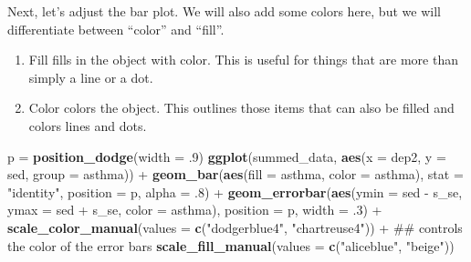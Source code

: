 \documentclass[]{tufte-book}
\newenvironment{Shaded}{}{}
\newcommand{\KeywordTok}[1]{\textcolor[rgb]{0.00,0.44,0.13}{\textbf{#1}}}
\newcommand{\DataTypeTok}[1]{\textcolor[rgb]{0.56,0.13,0.00}{#1}}
\newcommand{\DecValTok}[1]{\textcolor[rgb]{0.25,0.63,0.44}{#1}}
\newcommand{\StringTok}[1]{\textcolor[rgb]{0.25,0.44,0.63}{#1}}
\newcommand{\OperatorTok}[1]{\textcolor[rgb]{0.40,0.40,0.40}{#1}}
\newcommand{\NormalTok}[1]{#1}
\providecommand{\tightlist}{%
  \setlength{\itemsep}{0pt}\setlength{\parskip}{0pt}}
\theoremstyle{definition}
\theoremstyle{definition}
\theoremstyle{remark}
\begin{document}
Next, let's adjust the bar plot. We will also add some colors here, but
we will differentiate between ``color'' and ``fill''.

\begin{enumerate}
\def\labelenumi{\arabic{enumi}.}
\tightlist
\item
  Fill fills in the object with color. This is useful for things that
  are more than simply a line or a dot.
\item
  Color colors the object. This outlines those items that can also be
  filled and colors lines and dots.
\end{enumerate}

\begin{Shaded}
\begin{Highlighting}[]
\NormalTok{p =}\StringTok{ }\KeywordTok{position_dodge}\NormalTok{(}\DataTypeTok{width =}\NormalTok{ .}\DecValTok{9}\NormalTok{)}
\KeywordTok{ggplot}\NormalTok{(summed_data, }\KeywordTok{aes}\NormalTok{(}\DataTypeTok{x =}\NormalTok{ dep2, }\DataTypeTok{y =}\NormalTok{ sed, }\DataTypeTok{group =}\NormalTok{ asthma)) }\OperatorTok{+}
\StringTok{  }\KeywordTok{geom_bar}\NormalTok{(}\KeywordTok{aes}\NormalTok{(}\DataTypeTok{fill =}\NormalTok{ asthma, }\DataTypeTok{color =}\NormalTok{ asthma), }
           \DataTypeTok{stat =} \StringTok{"identity"}\NormalTok{, }
           \DataTypeTok{position =}\NormalTok{ p,}
           \DataTypeTok{alpha =}\NormalTok{ .}\DecValTok{8}\NormalTok{) }\OperatorTok{+}
\StringTok{  }\KeywordTok{geom_errorbar}\NormalTok{(}\KeywordTok{aes}\NormalTok{(}\DataTypeTok{ymin =}\NormalTok{ sed }\OperatorTok{-}\StringTok{ }\NormalTok{s_se, }\DataTypeTok{ymax =}\NormalTok{ sed }\OperatorTok{+}\StringTok{ }\NormalTok{s_se,}
                    \DataTypeTok{color =}\NormalTok{ asthma), }
                \DataTypeTok{position =}\NormalTok{ p,}
                \DataTypeTok{width =}\NormalTok{ .}\DecValTok{3}\NormalTok{) }\OperatorTok{+}
\StringTok{  }\KeywordTok{scale_color_manual}\NormalTok{(}\DataTypeTok{values =} \KeywordTok{c}\NormalTok{(}\StringTok{"dodgerblue4"}\NormalTok{, }\StringTok{"chartreuse4"}\NormalTok{)) }\OperatorTok{+}\StringTok{   }\NormalTok{## controls the color of the error bars}
\StringTok{  }\KeywordTok{scale_fill_manual}\NormalTok{(}\DataTypeTok{values =} \KeywordTok{c}\NormalTok{(}\StringTok{"aliceblue"}\NormalTok{, }\StringTok{"beige"}\NormalTok{))}
\end{Highlighting}
\end{Shaded}
\end{document}
